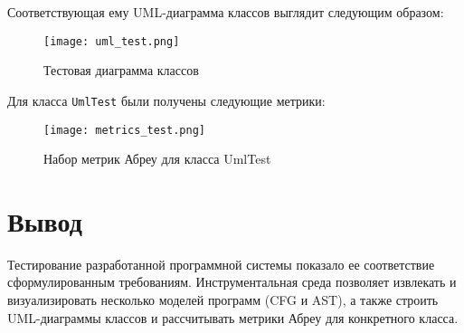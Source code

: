 Соответствующая ему UML-диаграмма классов выглядит следующим образом:

\begin{figure}[h]
    \begin{center}
        \texttt{[image: uml\_test.png]}
    \end{center}
    \caption{Тестовая диаграмма классов}
    \label{fig:uml_test}
\end{figure}
\newpage

Для класса \texttt{UmlTest} были получены следующие метрики:

\begin{figure}[h]
    \begin{center}
        \texttt{[image: metrics\_test.png]}
    \end{center}
    \caption{Набор метрик Абреу для класса UmlTest}
    \label{fig:metrics_test}
\end{figure}

\section{Вывод}

Тестирование разработанной программной системы показало ее соответствие
сформулированным требованиям. Инструментальная среда позволяет извлекать и
визуализировать несколько моделей программ (CFG и AST), а также строить
UML-диаграммы классов и рассчитывать метрики Абреу для конкретного класса.
